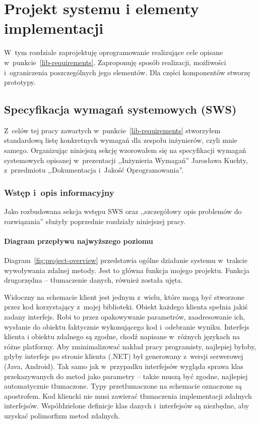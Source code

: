 \chapter{Projekt systemu i elementy implementacji}
W~tym rozdziale zaprojektuję oprogramowanie realizujące cele opisane w~punkcie~\ref{lib-requirements}.
Zaproponuję sposób realizacji, możliwości i~ograniczenia poszczególnych jego elementów. Dla części komponentów stworzę prototypy.

\section{Specyfikacja wymagań systemowych (SWS)}
Z~celów tej pracy zawartych w~punkcie~\ref{lib-requirements} stworzyłem standardową listę konkretnych wymagań dla zespołu inżynierów, czyli mnie samego.
Organizując niniejszą sekcję wzorowałem się na specyfikacji wymagań systemowych opisanej w~prezentacji ,,Inżynieria Wymagań'' Jarosława Kuchty, z~przedmiotu ,,Dokumentacja i~Jakość Oprogramowania''\cite{kuchta}.


\subsection{Wstęp i~opis informacyjny}
Jako rozbudowana sekcja wstępu SWS oraz ,,szczegółowy opis problemów do rozwiązania'' służyły poprzednie rozdziały niniejszej pracy.


\subsubsection{Diagram przepływu najwyższego poziomu}
Diagram~\ref{fig:project-overview} przedstawia ogólne działanie systemu w~trakcie wywoływania zdalnej metody. Jest to główna funkcja mojego projektu. Funkcja drugorzędna -- tłumaczenie danych, również została ujęta.


Widoczny na schemacie klient jest jednym z~wielu, które mogą być stworzone przez kod korzystający z~mojej biblioteki.
Obiekt każdego klienta spełnia jakiś zadany interfejs. Robi to przez opakowywanie parametrów, zaadresowanie ich, wysłanie do obiektu faktycznie wykonującego kod i~odebranie wyniku.
Interfejs klienta i obiektu zdalnego są zgodne, chodź napisane w~różnych językach na różne platformy. Aby zminimalizować nakład pracy programisty, najlepiej byłoby, gdyby interfejs po stronie klienta (.NET) był generowany z~wersji serwerowej (Java, Android).
Tak samo jak w~przypadku interfejsów wygląda sprawa klas przekazywanych do metod jako parametry -- także muszą być zgodne, najlepiej automatycznie tłumaczone.
Typy przetłumaczone na schemacie oznaczone są apostrofem.
Kod kliencki nie musi zawierać tłumaczenia implementacji zdalnych interfejsów.
Współdzielone definicje klas danych i~interfejsów są niezbędne, aby uzyskać polimorfizm metod zdalnych.

